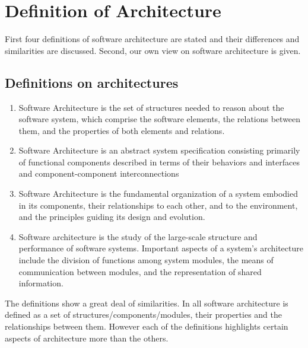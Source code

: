 \documentclass{article}
\begin{document}
\setlength\parindent{0pt}
\section{Definition of Architecture}

First four definitions of software architecture are stated and their differences
and similarities are discussed. Second, our own view on software architecture is
given.
\subsection{Definitions on architectures}

\begin{enumerate}
\item Software Architecture is the set of structures needed to reason about the software system, which comprise the software elements, the relations between them, and the properties of both elements and relations.\cite{clemens}

\item Software Architecture is an abstract system specification consisting primarily of functional components described in terms of their behaviors and interfaces and component-component interconnections\cite{hayesroth}

\item Software Architecture is the fundamental organization of a system embodied in its components, their relationships to each other, and to the environment, and the principles guiding its design and evolution.\cite{IEEE1471}

\item Software architecture is the study of the large-scale structure and performance of software systems. Important aspects of a system's architecture include the division of functions among system modules, the means of communication between modules, and the representation of shared information.\cite{lane90}

\end{enumerate}

The definitions show a great deal of similarities. In all software architecture
is defined as a set of structures/components/modules, their properties and the
relationships between them. However each of the definitions highlights certain
aspects of architecture more than the others. 
\end{document}
